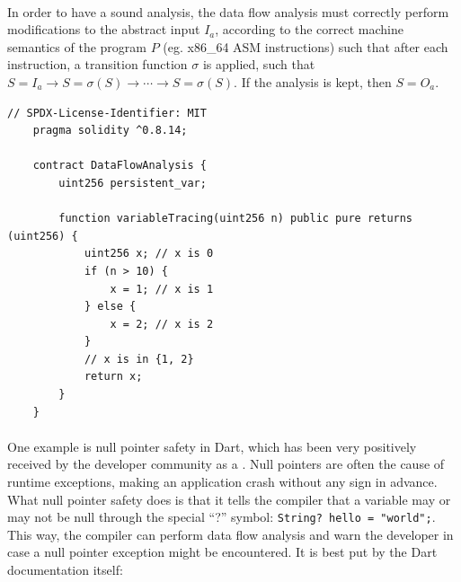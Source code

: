 \paragraph*{}
In order to have a sound analysis, the data flow analysis must correctly perform modifications to the abstract input $I_a$, according to the correct machine semantics of the program $P$ (eg. x86\_64 ASM instructions) such that after each instruction, a transition function $\sigma$ is applied, such that $S = I_a \rightarrow S = \sigma(S) \rightarrow \cdots \rightarrow S = \sigma(S)$. If the analysis is kept, then $S=O_a$.



\begin{lstlisting}[language=Solidity, caption={Simple example of how data flow analysis is used to trace the values of a variable through the execution flow.}]
    // SPDX-License-Identifier: MIT
    pragma solidity ^0.8.14;
    
    contract DataFlowAnalysis {
        uint256 persistent_var;
    
        function variableTracing(uint256 n) public pure returns (uint256) {
            uint256 x; // x is 0
            if (n > 10) {
                x = 1; // x is 1
            } else {
                x = 2; // x is 2
            }
            // x is in {1, 2}
            return x;
        }
    }    
\end{lstlisting}

\paragraph*{}
One example is null pointer safety in Dart, which has been very positively received by the developer community as a \cite[boost to productivity]{proxify-dart-null}. Null pointers are often the cause of runtime exceptions, making an application crash without any sign in advance. What null pointer safety does is that it tells the compiler that a variable may or may not be null through the special ``?'' symbol: \lstinline[columns=fixed]{String? hello = "world";}. This way, the compiler can perform data flow analysis and warn the developer in case a null pointer exception might be encountered. It is best put by the Dart documentation itself: \cite[runtime null-dereference errors turn into edit-time analysis errors.]{dart-dev-null-safety}
